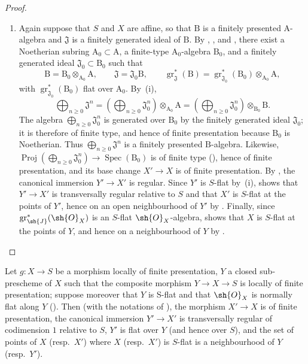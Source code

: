 \begin{proof}
\begin{enumerate}[label=(\roman*)]
  \item Again suppose that $S$ and $X$ are affine, so that $\mathrm{B}$ is a finitely presented $\mathrm{A}$-algebra and $\mathfrak{J}$ is a finitely generated ideal of $\mathrm{B}$. By , , and , there exist a Noetherian subring $\mathrm{A}_0\subset\mathrm{A}$, a finite-type $\mathrm{A}_0$-algebra $\mathrm{B}_0$, and a finitely generated ideal $\mathfrak{J}_0\subset\mathrm{B}_0$ such that
\[
  \mathrm{B}=\mathrm{B}_0\otimes_{\mathrm{A}_0}\mathrm{A},\qquad
  \mathfrak{J}=\mathfrak{J}_0\mathrm{B},\qquad
  \operatorname{gr}_{\mathfrak{J}}^*(\mathrm{B})=\operatorname{gr}_{\mathfrak{J}_0}^*(\mathrm{B}_0)\otimes_{\mathrm{A}_0}\mathrm{A},
\]
with $\operatorname{gr}_{\mathfrak{J}_0}^*(\mathrm{B}_0)$ flat over $\mathrm{A}_0$. By~(i),
\[
  \bigoplus_{n\geq0}\mathfrak{J}^n=\left(\bigoplus_{n\geq0}\mathfrak{J}_0^n\right)\otimes_{\mathrm{A}_0}\mathrm{A}=\left(\bigoplus_{n\geq0}\mathfrak{J}_0^n\right)\otimes_{\mathrm{B}_0}\mathrm{B}.
\]
The algebra $\bigoplus_{n\geq0}\mathfrak{J}_0^n$ is generated over $\mathrm{B}_0$ by the finitely generated ideal $\mathfrak{J}_0$; it is therefore of finite type, and hence of finite presentation because $\mathrm{B}_0$ is Noetherian. Thus $\bigoplus_{n\geq0}\mathfrak{J}^n$ is a finitely presented $\mathrm{B}$-algebra. Likewise, $\operatorname{Proj}(\bigoplus_{n\geq0}\mathfrak{J}_0^n)\to\operatorname{Spec}(\mathrm{B}_0)$ is of finite type (), hence of finite presentation, and its base change $X'\to X$ is of finite presentation.
By , the canonical immersion $Y'\to X'$ is regular. Since $Y'$ is $S$-flat by~(i),  shows that $Y'\to X'$ is transversally regular relative to $S$ and that $X'$ is $S$-flat at the points of $Y'$, hence on an open neighbourhood of $Y'$ by . Finally, since $\operatorname{gr}_\sh{J}^*(\sh{O}_X)$ is an $S$-flat $\sh{O}_X$-algebra,  shows that $X$ is $S$-flat at the points of $Y$, and hence on a neighbourhood of $Y$ by .
\end{enumerate}
\end{proof}

\begin{corollary}[19.4.7]
\label{IV.19.4.7}
Let $g:X\to S$ be a morphism locally of finite presentation, $Y$ a closed sub-prescheme of $X$ such that the composite morphism $Y\to X\to S$ is locally of finite presentation; suppose moreover that $Y$ is S-flat and that $\sh{O}_X$ is normally flat along $Y$ ().
Then (with the notations of ), the morphism $X'\to X$ is of finite presentation, the canonical immersion $Y'\to X'$ is transversally regular of codimension $1$ relative to $S$, $Y'$ is flat over $Y$ (and hence over $S$), and the set of points of $X$ (resp.\ $X'$) where $X$ (resp.\ $X'$) is $S$-flat is a neighbourhood of $Y$ (resp.\ $Y'$).
\end{corollary}

